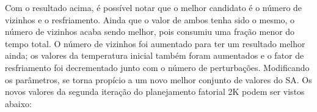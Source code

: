 \documentclass[
	12pt,				%
	openright,			%
	twoside,			%
	a4paper,			%
	english,			%
	french,				%
	spanish,			%
	brazil				%
	]{abntex2}
\begin{document}
Com o resultado acima, é possível notar que o melhor candidato é o número de vizinhos e o resfriamento. Ainda que o valor de ambos tenha sido o mesmo, o número de vizinhos acaba sendo melhor, pois consumiu uma fração menor do tempo total. O número de vizinhos foi aumentado para ter um resultado melhor ainda; os valores da temperatura inicial também foram aumentados e o fator de resfriamento foi decrementado junto com o número de perturbações. Modificando os parâmetros, se torna propício a um novo melhor conjunto de valores do SA. Os novos valores da segunda iteração do planejamento fatorial 2K podem ser vistos abaixo:

\begin{table}[ht]
	\centering
	\caption{Fatores para parâmetro para o \textit{Simulated Annealing} na segunda iteração}
	\label{tabela_parametros_2}
\end{table}
\end{document}
